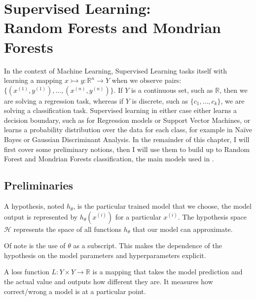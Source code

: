 \chapter{Supervised Learning:\\Random Forests and Mondrian Forests}
\label{appendix:supervised}

In the context of Machine Learning, Supervised Learning tasks itself with
learning a mapping $x \rightarrowtail y: \mathbb{R}^n \rightarrow Y$ when we
observe pairs: $\{(x^{(1)}, y^{(1)}),\dots,(x^{(n)}, y^{(n)})\}$. If $Y$ is a
continuous set, such as $\mathbb{R}$, then we are solving a regression task,
whereas if $Y$ is discrete, such as $\{c_1, \dots, c_k\}$, we are solving a
classification task. Supervised learning in either case either learns a decision
boundary, such as for Regression models or Support Vector Machines, or learns a
probability distribution over the data for each class, for example in Na\"ive
Bayes or Gaussian Discriminant Analysis. In the remainder of this chapter, I
will first cover some preliminary notions, then I will use them to build up to
Random Forest and Mondrian Forests classification, the main models used in
.

\section{Preliminaries}
\label{appendix:supervised:prelim}

\begin{definition}
    A hypothesis, noted $h_{\theta}$, is the particular trained model that we
    choose, the model output is represented by $h_{\theta}(x^{(i)})$ for a
    particular $x^{(i)}$. The hypothesis space $\mathcal{H}$ represents the
    space of all functions $h_{\theta}$ that our model can approximate.
\end{definition}
%
\noindent Of note is the use of $\theta$ as a subscript. This makes the
dependence of the hypothesis on the model parameters and hyperparameters
explicit.

\begin{definition}
    A loss function $L: Y \times Y \rightarrow \mathbb{R}$ is a mapping that
    takes the model prediction and the actual value and outputs how different
    they are. It measures how correct/wrong a model is at a particular point.
    
\end{definition}

